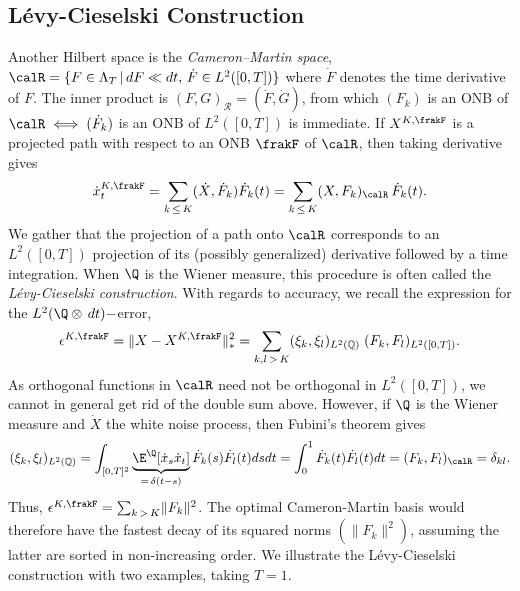 \subsection{Lévy-Cieselski Construction}\label{ssec:LC}
Another Hilbert space  is the \textit{Cameron–Martin space}, 
$\calR = \{F \in \Lambda_T \, | \, dF \ll dt, \, \dot{F} \in L^2([0,T]) \} $ 
where $\dot{F}$ denotes the time derivative of $F$. The inner product is  $(F,G)_{\mathcal{R}} = (\dot{F}, \dot{G})$, from which 
$(F_k)$  is an ONB of  $\calR \; \Longleftrightarrow \; (\dot{F}_k)$  is an ONB of  $L^2([0,T])$
is immediate.
If $X^{K,\frakF}$ is a projected path with respect to an ONB $\frakF$ of $\calR$, then taking derivative gives
$$\dot{x}_t^{K,\frakF} = \sum_{k \, \le \, K} (\dot{X},\dot{F}_k)\dot{F}_k(t) = \sum_{k \, \le \, K} (X,F_k)_{\calR}\, \dot{F}_k(t). $$
 We gather that the projection of a path onto $\calR$ corresponds to an  $L^2([0,T])$ projection of its (possibly generalized)  derivative 
 followed by a time integration.
When $\Q$ is the Wiener measure, this procedure  is often called the \textit{Lévy-Cieselski construction}.  
With regards to accuracy, we recall the expression for the  $L^2(\Q \otimes \, dt)-$error,
$$\epsilon^{K,\frakF} = \lVert X - X^{K,\frakF}\rVert^2_{*} = \sum_{k,l \, > \, K}(\xi_k,\xi_l)_{L^2(\mathbb{Q})} \;(F_k,F_l)_{L^2([0,T])}.\vspace{-2mm}$$
As orthogonal functions in $\calR$ need not be orthogonal in $L^2([0,T])$, we cannot in general get rid of the double sum above. 
However, if $\Q$ is the Wiener measure and $\dot{X}$ the white noise process, then Fubini's theorem gives 
$$(\xi_k,\xi_l)_{L^2(\mathbb{Q})} = \int_{[0,T]^2}  \underbrace{\E^{\Q}[\dot{x}_s \dot{x}_t]}_{=\, \delta(t-s)}\dot{F}_k(s) \dot{F}_l(t) ds dt = \int_0^1 \dot{F}_k(t) \dot{F}_l(t) dt = (F_k,F_l)_{\calR}= \delta_{kl} .$$
Thus, 
$\epsilon^{K,\frakF} = \sum_{k\, >\, K} \lVert F_k \rVert^2 $.
The optimal Cameron-Martin basis would therefore have the fastest decay of its squared norms $(\lVert F_k \rVert^2)$, assuming the latter are sorted in non-increasing order.
We illustrate the Lévy-Cieselski construction with two examples, taking $T=1$.


